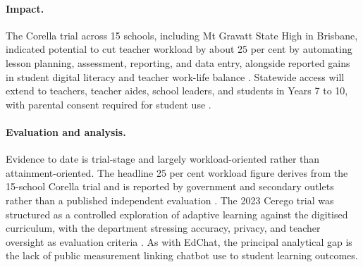 \paragraph{Impact.}
The Corella trial across 15 schools, including Mt Gravatt State High in Brisbane,
indicated potential to cut teacher workload by about 25 per cent by automating lesson
planning, assessment, reporting, and data entry, alongside reported gains in student
digital literacy and teacher work-life balance
\autocite{educationdailyCorellaRollout2025}. Statewide access will extend to teachers,
teacher aides, school leaders, and students in Years 7 to 10, with parental consent
required for student use \autocite{educationdailyCorellaRollout2025}.

\paragraph{Evaluation and analysis.}
Evidence to date is trial-stage and largely workload-oriented rather than
attainment-oriented. The headline 25 per cent workload figure derives from the
15-school Corella trial and is reported by government and secondary outlets rather than
a published independent evaluation \autocite{educationdailyCorellaRollout2025}. The
2023 Cerego trial was structured as a controlled exploration of adaptive learning
against the digitised curriculum, with the department stressing accuracy, privacy, and
teacher oversight as evaluation criteria \autocite{queenslandAITrialSchools2023}. As
with EdChat, the principal analytical gap is the lack of public measurement linking
chatbot use to student learning outcomes.
